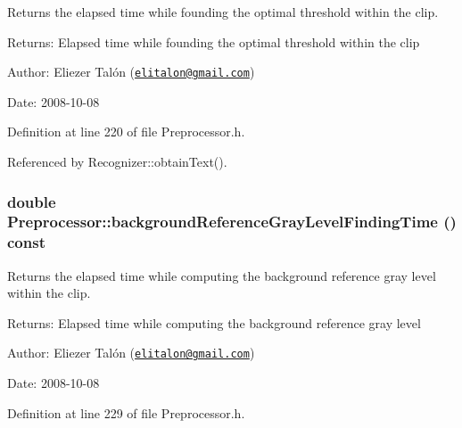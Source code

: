 Returns the elapsed time while founding the optimal threshold within the clip. 

\begin{Desc}
\item[Returns:]Elapsed time while founding the optimal threshold within the clip\end{Desc}
\begin{Desc}
\item[Author:]Eliezer Talón (\href{mailto:elitalon@gmail.com}{\tt elitalon@gmail.com}) \end{Desc}
\begin{Desc}
\item[Date:]2008-10-08 \end{Desc}


Definition at line 220 of file Preprocessor.h.

Referenced by Recognizer::obtainText().\hypertarget{class_preprocessor_3189cad5515476d54cc14effcf983fc7}{
\subsubsection[backgroundReferenceGrayLevelFindingTime]{\setlength{\rightskip}{0pt plus 5cm}double Preprocessor::backgroundReferenceGrayLevelFindingTime () const}}
\label{class_preprocessor_3189cad5515476d54cc14effcf983fc7}


Returns the elapsed time while computing the background reference gray level within the clip. 

\begin{Desc}
\item[Returns:]Elapsed time while computing the background reference gray level\end{Desc}
\begin{Desc}
\item[Author:]Eliezer Talón (\href{mailto:elitalon@gmail.com}{\tt elitalon@gmail.com}) \end{Desc}
\begin{Desc}
\item[Date:]2008-10-08 \end{Desc}


Definition at line 229 of file Preprocessor.h.

